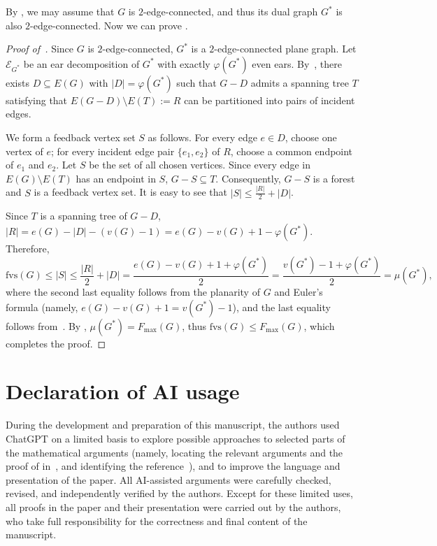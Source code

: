 \documentclass[a4paper,12pt]{article}
\theoremstyle{plain}
\theoremstyle{definition}
\theoremstyle{remark}
\numberwithin{equation}{section}
\newcommand{\abs}[1]{\lvert#1\rvert}
\begin{document}
By , we may assume that $G$ is $2$-edge-connected, and thus its dual graph $G^*$ is also $2$-edge-connected. Now we can prove .

\begin{proof}[Proof of~]
  Since $G$ is $2$-edge-connected, $G^*$ is a $2$-edge-connected plane graph. Let $\mathcal{E}_{G^*}$ be an ear decomposition of $G^*$ with exactly $\varphi(G^*)$ even ears. By~, there exists $D\subseteq E(G)$ with $\abs{D}=\varphi(G^*)$ such that $G-D$ admits a spanning tree $T$ satisfying that $E(G-D)\setminus E(T):=R$ can be partitioned into pairs of incident edges.
  
  We form a feedback vertex set $S$ as follows. For every edge $e\in D$, choose one vertex of $e$; for every incident edge pair $\{e_1,e_2\}$ of $R$, choose a common endpoint of $e_1$ and $e_2$. Let $S$ be the set of all chosen vertices. Since every edge in $E(G)\setminus E(T)$ has an endpoint in $S$, $G-S\subseteq T$. Consequently, $G-S$ is a forest and $S$ is a feedback vertex set. It is easy to see that $|S|\le\frac{|R|}{2}+|D|$. 
  
  Since $T$ is a spanning tree of $G-D$, $|R|=e(G)-\abs{D}-(v(G)-1)=e(G)-v(G)+1-\varphi(G^*).$ Therefore, $$\mathrm{fvs}(G)\le |S|\le\frac{|R|}{2}+|D|=\frac{e(G)-v(G)+1+\varphi(G^*)}{2}=\frac{v(G^*)-1+\varphi(G^*)}{2}=\mu(G^*),$$ where the second last equality follows from the planarity of $G$ and Euler's formula (namely, $e(G)-v(G)+1=v(G^*)-1$), and the last equality follows from~. By , $\mu(G^*)=F_{\max}(G)$, thus $\mathrm{fvs}(G)\le F_{\max}(G)$, which completes the proof.
\end{proof}

\section*{Declaration of AI usage}
During the development and preparation of this manuscript, the authors used ChatGPT on a limited basis to explore possible approaches to selected parts of the mathematical arguments (namely, locating the relevant arguments and the proof of  in~\cite{KK2012}, and identifying the reference~\cite{F1993}), and to improve the language and presentation of the paper. All AI-assisted arguments were carefully checked, revised, and independently verified by the authors. Except for these limited uses, all proofs in the paper and their presentation were carried out by the authors, who take full responsibility for the correctness and final content of the manuscript.
\end{document}
